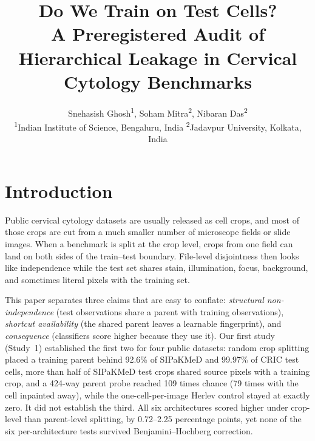 \documentclass[11pt]{article}
\title{Do We Train on Test Cells?\\[2pt]
\large A Preregistered Audit of Hierarchical Leakage in Cervical Cytology Benchmarks}
\author{Snehasish Ghosh\textsuperscript{1}, Soham Mitra\textsuperscript{2}, Nibaran Das\textsuperscript{2}\\[4pt]
\small \textsuperscript{1}Indian Institute of Science, Bengaluru, India\quad
\textsuperscript{2}Jadavpur University, Kolkata, India}
\date{}
\begin{document}
\maketitle

\begin{abstract}

\end{abstract}

\section{Introduction}

Public cervical cytology datasets are usually released as cell crops, and most of those
crops are cut from a much smaller number of microscope fields or slide images. When a
benchmark is split at the crop level, crops from one field can land on both sides of
the train--test boundary. File-level disjointness then looks like independence while the
test set shares stain, illumination, focus, background, and sometimes literal pixels
with the training set.

This paper separates three claims that are easy to conflate:
\emph{structural non-independence} (test observations share a parent with training
observations), \emph{shortcut availability} (the shared parent leaves a learnable
fingerprint), and \emph{consequence} (classifiers score higher because they use it).
Our first study (Study~1) established the first two for four public datasets: random
crop splitting placed a training parent behind 92.6\% of SIPaKMeD and 99.97\% of CRIC test
cells, more than half of SIPaKMeD test crops shared source pixels with a training crop,
and a 424-way parent probe reached 109 times chance (79 times with the cell inpainted
away), while the one-cell-per-image Herlev control stayed at exactly zero. It did not
establish the third. All six architectures scored higher under crop-level than
parent-level splitting, by 0.72--2.25 percentage points, yet none of the six
per-architecture tests survived Benjamini--Hochberg correction.
\end{document}
